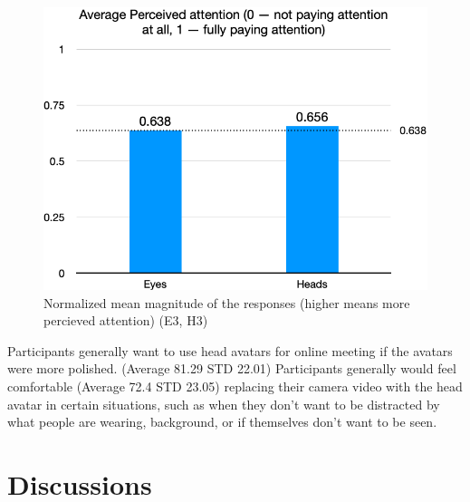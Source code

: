 \begin{figure}
	\centering
 	\includegraphics[width=\textwidth]{matrix-amp.png}
	\caption{Normalized mean magnitude of the responses (higher means more percieved attention) (E3, H3)}
	\label{fig:matrix-attention}
\end{figure}





Participants generally want to use head avatars for online meeting if the avatars were more polished. (Average 81.29 STD 22.01) 
Participants generally would feel comfortable (Average 72.4 STD 23.05) replacing their camera video with the head avatar in certain situations, such as when they don’t want to be distracted by what people are wearing, background, or if themselves don’t want to be seen. 


\section{Discussions}

